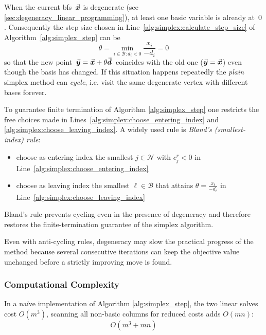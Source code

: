 When the current \gls{bfs}~$\vec{\boldsymbol{x}}$ is {degenerate} (see \ref{sec:degeneracy_linear_programming}), at least one basic variable is already at~$0$.
Consequently the step size chosen in Line~\ref{alg:simplex:calculate_step_size} of Algorithm~\ref{alg:simplex_step} can be
\[
  \theta = \min_{i\in\mathcal B : d_i<0}\frac{x_i}{-d_i}=0
\]
so that the new point $\,\vec{\boldsymbol{y}}= \vec{\boldsymbol{x}}+\theta\vec{\boldsymbol{d}}\,$ coincides with the old one ($\vec{\boldsymbol{y}}=\vec{\boldsymbol{x}}$) even though the basis has changed.
If this situation happens repeatedly the \emph{plain} simplex method can \emph{cycle}, i.e. visit the same degenerate vertex with different bases forever.

To guarantee finite termination of Algorithm \ref{alg:simplex_step} one restricts the free choices made in Lines~\ref{alg:simplex:choose_entering_index} and \ref{alg:simplex:choose_leaving_index}.
A widely used rule is \emph{Bland's (smallest-index) rule}:
\begin{itemize}
\item choose as entering index the {smallest} $j\in\mathcal N$ with $c^r_j<0$ in Line~\ref{alg:simplex:choose_entering_index}
\item choose as leaving index the {smallest} $\ell\in\mathcal B$ that attains $\theta=\frac{x_\ell}{-d_\ell}$ in Line~\ref{alg:simplex:choose_leaving_index}
\end{itemize}

Bland's rule prevents cycling even in the presence of degeneracy and therefore restores the finite-termination guarantee of the simplex algorithm.

Even with anti-cycling rules, degeneracy may slow the practical
progress of the method because several consecutive iterations can keep
the objective value unchanged before a strictly improving move is
found.



\subsubsection{Computational Complexity}\label{subsec:simplex_complexity}


In a naïve implementation of Algorithm \ref{alg:simplex_step}, the two linear solves cost \(O(m^{3})\), scanning all non-basic columns for reduced costs adds \(O(mn)\):
\[
  O(m^{3}+mn)
\]
 
